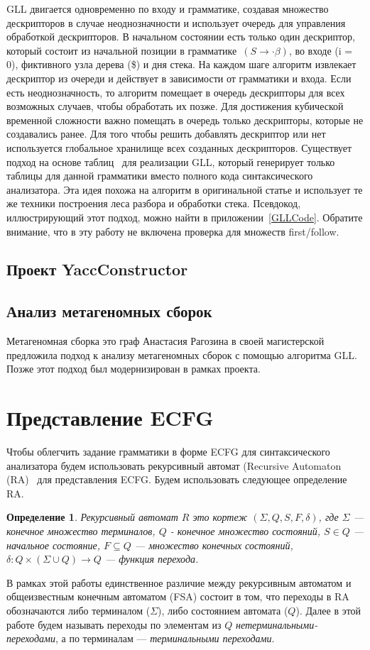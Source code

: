 \documentclass[12pt]{matmex-diploma-custom}
\newtheorem{mydef}{Определение}
\begin{document}
	GLL двигается одновременно по входу и грамматике, создавая множество дескрипторов
	в случае неоднозначности и использует очередь для управления обработкой дескрипторов.
	В начальном состоянии есть только один дескриптор, который состоит из начальной 
	позиции в грамматике~$(S \to \cdot \beta)$, во входе (i = 0), фиктивного узла дерева (\$)
	и дня стека. На каждом шаге алгоритм извлекает дескриптор из очереди и действует
	в зависимости от грамматики и входа. Если есть неоднозначность, то алгоритм помещает
	в очередь дескрипторы для всех возможных случаев, чтобы обработать их позже. 
	Для достижения кубической временной сложности важно помещать в очередь только дескрипторы,
	которые не создавались ранее. Для того чтобы решить добавлять дескриптор или нет
	используется глобальное хранилище всех созданных дескрипторов.
	Существует подход на основе таблиц~\cite{ragozina} для реализации GLL, который генерирует
	только таблицы для данной грамматики вместо полного кода синтаксического анализатора.
	Эта идея похожа на алгоритм в оригинальной статье и использует те же техники
	построения леса разбора и обработки стека. Псевдокод, иллюстрирующий этот подход, 
	можно найти в приложении~\ref{GLLCode}. Обратите внимание, что в эту работу не включена
	проверка для множеств first/follow.
	
	\subsection{Проект YaccConstructor}
	
	\subsection{Анализ метагеномных сборок}
	
	
	Метагеномная сборка это граф
	Анастасия Рагозина в своей магистерской предложила подход к анализу метагеномных
	сборок с помощью алгоритма GLL. Позже этот подход был модернизирован в рамках проекта.
	
	
	\section{Представление ECFG}
	
	Чтобы облегчить задание грамматики в форме ECFG для синтаксического анализатора
	будем использовать рекурсивный автомат (Recursive Automaton (RA)~\cite{tellier2006learning}
	для представления ECFG. Будем использовать следующее определение RA.
	\begin{mydef}
		Рекурсивный автомат $R$ это кортеж $(\Sigma, Q, S, F, \delta)$, где $\Sigma$
		--- конечное множество терминалов, $Q$ - конечное множество состояний, $S \in Q$ 
		--- начальное состояние, $F \subseteq Q$ --- множество конечных состояний,
		$\delta : Q \times (\Sigma \cup Q) \to Q$ --- функция перехода.
	\end{mydef}
	В рамках этой работы единственное различие между рекурсивным автоматом и общеизвестным
	конечным автоматом (FSA) состоит в том, что переходы в RA обозначаются либо терминалом ($\Sigma$),
	либо состоянием автомата ($Q$). Далее в этой работе будем называть переходы по элементам из
	$Q$ \textit{нетерминальными-переходами}, а по терминалам --- \textit{терминальными переходами}.
	
\end{document}
